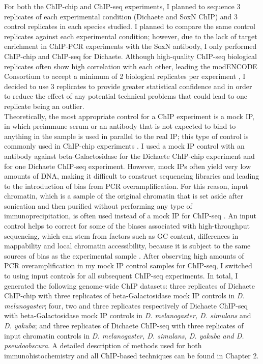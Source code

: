 For both the ChIP-chip and ChIP-seq experiments, I planned to sequence 3 replicates of each experimental condition (Dichaete and SoxN ChIP) and 3 control replicates in each species studied. I planned to compare the same control replicates against each experimental condition; however, due to the lack of target enrichment in ChIP-PCR experiments with the SoxN antibody, I only performed ChIP-chip and ChIP-seq for Dichaete. Although high-quality ChIP-seq biological replicates often show high correlation with each other, leading the modENCODE Consortium to accept a minimum of 2 biological replicates per experiment \citep{landt_chip-seq_2012}, I decided to use 3 replicates to provide greater statistical confidence and in order to reduce the effect of any potential technical problems that could lead to one replicate being an outlier. \\

Theoretically, the most appropriate control for a ChIP experiment is a mock IP, in which preimmune serum or an antibody that is not expected to bind to anything in the sample is used in parallel to the real IP; this type of control is commonly used in ChIP-chip experiments \citep{deplancke_analyzing_2012, park_widespread_2013}. I used a mock IP control with an antibody against beta-Galactosidase for the Dichaete ChIP-chip experiment and for one Dichaete ChIP-seq experiment. However, mock IPs often yield very low amounts of DNA, making it difficult to construct sequencing libraries and leading to the introduction of bias from PCR overamplification. For this reason, input chromatin, which is a sample of the original chromatin that is set aside after sonication and then purified without performing any type of immunoprecipitation, is often used instead of a mock IP for ChIP-seq \citep{deplancke_analyzing_2012}. An input control helps to correct for some of the biases associated with high-throughput sequencing, which can stem from factors such as GC content, differences in mappability and local chromatin accessibility, because it is subject to the same sources of bias as the experimental sample \citep{dohm_substantial_2008}. After observing high amounts of PCR overamplification in my mock IP control samples for ChIP-seq, I switched to using input controls for all subsequent ChIP-seq experiments. In total, I generated the following genome-wide ChIP datasets: three replicates of Dichaete ChIP-chip with three replicates of beta-Galactosidase mock IP controls in \emph{D. melanogaster}; four, two and three replicates respectively of Dichaete ChIP-seq with beta-Galactosidase mock IP controls in \emph{D. melanogaster, D. simulans} and \emph{D. yakuba}; and three replicates of Dichaete ChIP-seq with three replicates of input chromatin controls in \emph{D. melanogaster, D. simulans, D. yakuba and D. pseudoobscura}. A detailed description of methods used for both immunohistochemistry and all ChIP-based techniques can be found in Chapter 2.

